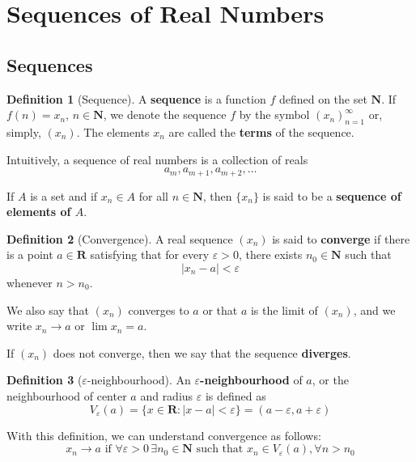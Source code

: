 \documentclass[12pt,a4paper]{article}
\theoremstyle{definition}
\newtheorem{definition}{Definition}[section]
\begin{document}
\newpage
\section{Sequences of Real Numbers}

\subsection{Sequences}

\begin{definition}[Sequence]
	A \textbf{sequence} is a function $f$ defined on the set $\textbf{N}$. If $f(n) = x_n$, $n \in \textbf{N}$, we denote the sequence $f$ by the symbol $(x_n)_{n=1}^\infty$ or, simply, $( x_n )$. The elements $x_n$ are called the \textbf{terms} of the sequence.
	
	Intuitively, a sequence of real numbers is a collection of reals \[a_m, a_{m+1}, a_{m+2}, \ldots\]
	
	If $A$ is a set and if $x_n \in A$ for all $n \in \textbf{N}$, then $\{ x_n \}$ is said to be a \textbf{sequence of elements of $A$}.
\end{definition}

\begin{definition}[Convergence]
	A real sequence $(x_n)$ is said to \textbf{converge} if there is a point $a \in \textbf{R}$ satisfying that for every $\varepsilon > 0$, there exists $n_0 \in \textbf{N}$ such that 
	\[ | x_n -a | < \varepsilon \]
	whenever $n > n_0$.
	
	We also say that $(x_n)$ converges to $a$ or that $a$ is the limit of $(x_n)$, and we write $x_n \longrightarrow a$ or $\lim x_n = a$.
	
	If $(x_n)$ does not converge, then we say that the sequence \textbf{diverges}.
\end{definition}

\begin{definition}[$\varepsilon$-neighbourhood]
	An \textbf{$\varepsilon$-neighbourhood} of $a$, or the neighbourhood of center $a$ and radius $\varepsilon$ is defined as
	\[ V_\varepsilon (a) = \{ x \in \textbf{R} : | x - a | < \varepsilon \} = (a-\varepsilon, a+ \varepsilon) \]
\end{definition}

With this definition, we can understand convergence as follows:
\[
	x_n \longrightarrow a \text{ if } \forall \varepsilon > 0 \, \exists n_0 \in \textbf{N} \text{ such that } x_n \in V_\varepsilon (a), \forall n > n_0
\]
\end{document}
